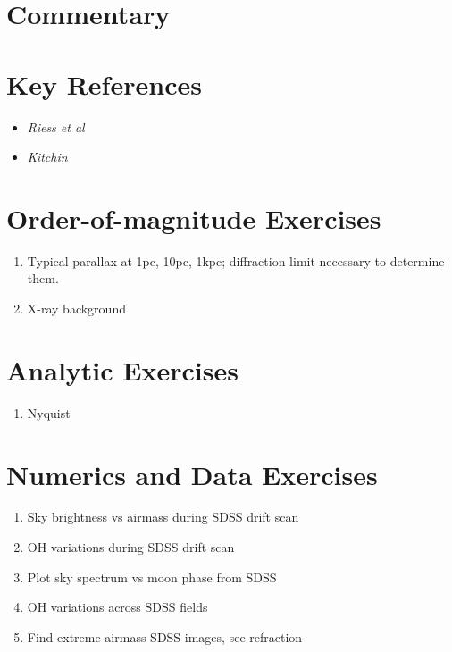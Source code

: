 \section{Commentary}


\section{Key References}

\begin{itemize}
  \item
    {\it Riess et al}
  \item
    {\it Kitchin}
\end{itemize}

\citet{gunn06a}

\section{Order-of-magnitude Exercises}

\begin{enumerate} 
\item Typical parallax at 1pc, 10pc, 1kpc; diffraction limit necessary
  to determine them.
\item X-ray background
\end{enumerate} 

\section{Analytic Exercises}

\begin{enumerate}
\item Nyquist
\end{enumerate}

\section{Numerics and Data Exercises}

\begin{enumerate}
\item Sky brightness vs airmass during SDSS drift scan
\item OH variations during SDSS drift scan
\item Plot sky spectrum vs moon phase from SDSS
\item OH variations across SDSS fields
\item Find extreme airmass SDSS images, see refraction
\end{enumerate}


  
